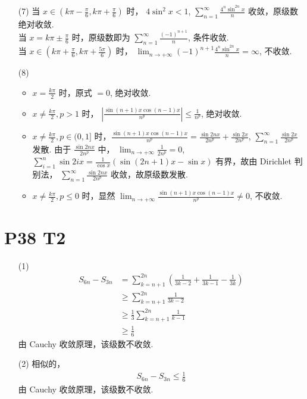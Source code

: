 \documentclass{article}
\newcommand{\sif}{\sum_{n = 1}^{\infty}}
\newcommand{\nti}{\lim_{n \to +\infty}}
\begin{document}
\begin{itemize}
    \item [(7)] 当 $x \in \left(k\pi - \frac{\pi}{6}, k\pi + \frac{\pi}{6}\right)$ 时， $4 \sin^2 x < 1$, $\sif \frac{4^n \sin^{2n} x}{n}$ 收敛，原级数绝对收敛. \\
    当 $x = k\pi \pm \frac{\pi}{6}$ 时，原级数即为 $\sif \frac{(-1)^{n + 1}}{n}$, 条件收敛. \\
    当 $x \in \left(k\pi + \frac{\pi}{6}, k\pi + \frac{5\pi}{6}\right)$ 时， $\nti (-1)^{n + 1} \frac{4^n \sin^{2n} x}{n} = \infty$, 不收敛. 
    \item [(8)] 
    \begin{itemize}
        \item $x = \frac{k\pi}{2}$ 时，原式 $= 0$, 绝对收敛.
        \item $x \neq \frac{k\pi}{2}, p > 1$ 时， $\left\lvert \frac{\sin (n + 1)x \cos(n - 1)x}{n^p}\right\rvert \leqslant \frac{1}{n^p}$, 绝对收敛.
        \item $x \neq \frac{k\pi}{2}, p \in (0, 1]$ 时，$\frac{\sin (n + 1)x \cos(n - 1)x}{n^p} = \frac{\sin 2nx}{2n^p} + \frac{\sin 2x}{2n^p}$, $\sif \frac{\sin 2x}{2n^p}$ 发散. 由于 $\frac{\sin 2nx}{2n^p}$ 中， $\nti \frac{1}{2n^p} = 0$, $\sum_{i = 1}^{n}\sin 2ix = \frac{1}{\cos x}\left(\sin (2n + 1)x - \sin x\right)$ 有界，故由 Dirichlet 判别法， $\sif \frac{\sin 2nx}{2n^p}$ 收敛，故原级数发散.
        \item $x \neq \frac{k\pi}{2}, p \leqslant 0$ 时，显然 $\nti \frac{\sin (n + 1)x \cos(n - 1)x}{n^p} \neq 0$, 不收敛.
    \end{itemize}
\end{itemize}

\section*{P38 T2}

\begin{itemize}
    \item [(1)] 
    \begin{align*}
        S_{6n} - S_{3n} &= \sum_{k = n + 1}^{2n}\left( \frac{1}{3k - 2} + \frac{1}{3k - 1} - \frac{1}{3k}\right) \\
        & \geqslant \sum_{k = n + 1}^{2n}\frac{1}{3k - 2} \\
        & \geqslant \frac{1}{3}\sum_{k = n + 1}^{2n}\frac{1}{k - 1} \\
        & \geqslant \frac{1}{6}
    \end{align*}
    由 Cauchy 收敛原理，该级数不收敛.
    \item [(2)] 相似的，
    \begin{align*}
        S_{6n} - S_{3n} \leqslant \frac{1}{6}
    \end{align*}    
    由 Cauchy 收敛原理，该级数不收敛.
\end{itemize}
\end{document}
